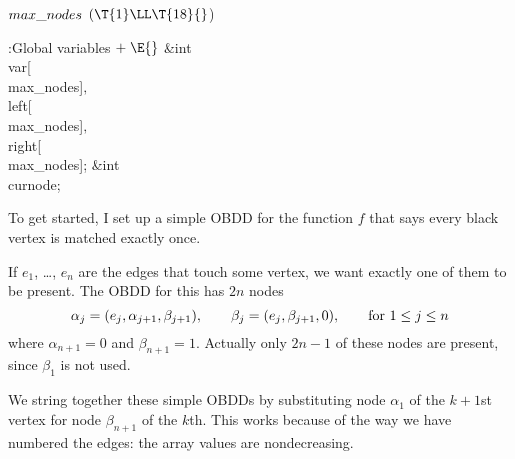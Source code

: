 \Y\B\4\D$\\{max\_nodes}$ \5
$(\T{1}\LL\T{18}{}$)\par
\Y\B\4:Global variables\X${}\mathrel+\E{}$\6
\&{int} \\{var}[\\{max\_nodes}]${},{}$ \\{left}[\\{max\_nodes}]${},{}$ %
\\{right}[\\{max\_nodes}];\6
\&{int} \\{curnode};\par
\fi

To get started, I set up a simple OBDD for the function $f$
that says
every black vertex is matched exactly once.

If $e_1$, \dots, $e_n$ are the edges that touch some vertex, we want exactly
one of them to be present. The OBDD for this has $2n$ nodes
$$\alpha_j=(e_j,\alpha_{j+1},\beta_{j+1}),\qquad
\beta_j =(e_j,\beta_{j+1},0),\qquad\hbox{for $1\le j\le n$}$$
where $\alpha_{n+1}=0$ and $\beta_{n+1}=1$. Actually only $2n-1$ of these
nodes are present, since $\beta_1$ is not used.

We string together these simple OBDDs by substituting node $\alpha_1$ of the
$k+1$st vertex for node $\beta_{n+1}$ of the $k$th. This works because of the
way we have numbered the edges: the  array values are
nondecreasing.

